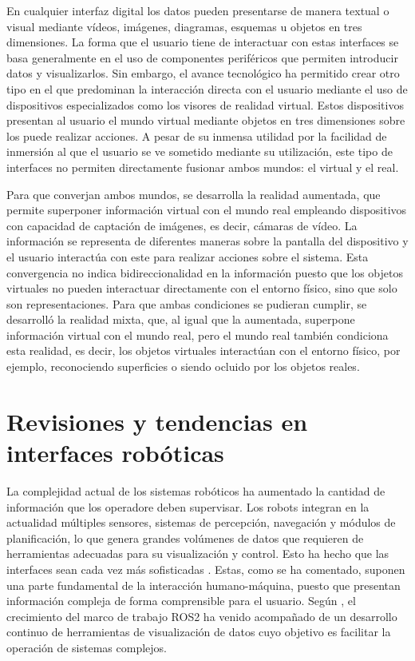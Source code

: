 En cualquier interfaz digital los datos pueden presentarse de manera textual o visual mediante vídeos, imágenes, diagramas, esquemas u objetos en tres dimensiones.
La forma que el usuario tiene de interactuar con estas interfaces se basa generalmente en el uso de componentes periféricos que permiten introducir 
datos y visualizarlos. 
Sin embargo, el avance tecnológico ha permitido crear otro tipo en el que predominan la interacción directa con el usuario mediante
el uso de dispositivos especializados como los visores de realidad virtual. Estos dispositivos presentan al usuario el mundo virtual mediante 
objetos en tres dimensiones sobre los puede realizar acciones. A pesar de su inmensa utilidad por la facilidad de inmersión al que el usuario
se ve sometido mediante su utilización, este tipo de interfaces no permiten directamente fusionar ambos mundos: el virtual y el real.

Para que converjan ambos mundos, se desarrolla la realidad aumentada, que permite superponer información virtual con el mundo real empleando 
dispositivos con capacidad de captación de imágenes, es decir, cámaras de vídeo. La información se representa de diferentes maneras sobre la 
pantalla del dispositivo y el usuario interactúa con este para realizar acciones sobre el sistema. Esta convergencia no indica bidireccionalidad
en la información puesto que los objetos virtuales no pueden interactuar directamente con el entorno físico, sino que solo son representaciones.
Para que ambas condiciones se pudieran cumplir, se desarrolló la realidad mixta, que, al igual que la aumentada, superpone información virtual con 
el mundo real, pero el mundo real también condiciona esta realidad, es decir, los objetos virtuales interactúan con el entorno físico, por ejemplo, 
reconociendo superficies o siendo ocluido por los objetos reales.

\section{Revisiones y tendencias en interfaces robóticas}
La complejidad actual de los sistemas robóticos ha aumentado la cantidad de información que los operadore deben supervisar.
Los robots integran en la actualidad múltiples sensores, sistemas de percepción, navegación y módulos de planificación, lo
que genera grandes volúmenes de datos que requieren de herramientas adecuadas para su visualización y control. Esto ha hecho
que las interfaces sean cada vez más sofisticadas \parencite{s21217120, 10.1145/3815113}.
Estas, como se ha comentado, suponen una parte fundamental de la interacción humano-máquina, puesto que presentan información
compleja de forma comprensible para el usuario. Según \cite{10.1145/3815113}, el crecimiento del marco de trabajo ROS2 ha venido 
acompañado de un desarrollo continuo de herramientas de visualización de datos cuyo objetivo es facilitar la operación de sistemas complejos.

